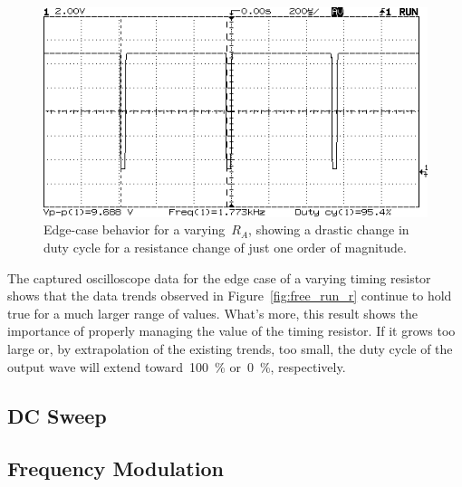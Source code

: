 \begin{figure}[H]
	\centering
	\includegraphics[width=.6\textwidth]{img/shot/shot3.png}
	\parbox{.6\textwidth}{
	\caption[Free Running Oscillator --- Varying $R_A$ at \SI{95.2}{\percent}
	Duty Cycle]{Edge-case behavior for a varying~$R_A$, showing a drastic
	change in duty cycle for a resistance change of just one order of
	magnitude.}
	\label{fig:shot3}}
\end{figure}
%
The captured oscilloscope data for the edge case of a varying timing resistor
shows that the data trends observed in Figure~\ref{fig:free_run_r} continue to
hold true for a much larger range of values.  What's more, this result shows
the importance of properly managing the value of the timing resistor.  If it
grows too large or, by extrapolation of the existing trends, too small, the
duty cycle of the output wave will extend toward~\SI{100}{\percent}
or~\SI{0}{\percent}, respectively.

\subsection{DC Sweep}
\begin{figure}[H]
	\centering
	
\end{figure}

\subsection{Frequency Modulation}
\begin{figure}[H]
	\centering
	
\end{figure}
